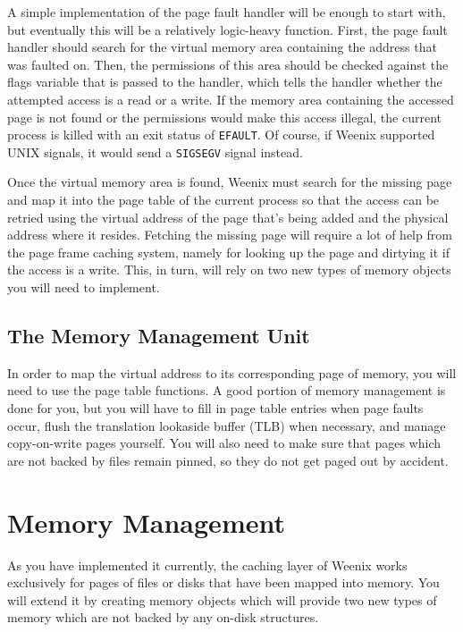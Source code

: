 A simple implementation of the page fault handler will be enough to start with, but eventually this will be a relatively logic-heavy function. First, the page fault handler should search for the virtual memory area containing the address that was faulted on. Then, the permissions of this area should be checked against the flags variable that is passed to the handler, which tells the handler whether the attempted access is a read or a write. If the memory area containing the accessed page is not found or the permissions would make this access illegal, the current process is killed with an exit status of \texttt{EFAULT}. Of course, if Weenix supported UNIX signals, it would send a \texttt{SIGSEGV} signal instead.

Once the virtual memory area is found, Weenix must search for the missing page and map it into the page table of the current process so that the access can be retried using the virtual address of the page that's being added and the physical address where it resides. Fetching the missing page will require a lot of help from the page frame caching system, namely for looking up the page and dirtying it if the access is a write. This, in turn, will rely on two new types of memory objects you will need to implement.

\subsection{The Memory Management Unit}

In order to map the virtual address to its corresponding page of memory, you will need to use the page table functions. A good portion of memory management is done for you, but you will have to fill in page table entries when page faults occur, flush the translation lookaside buffer (TLB) when necessary, and manage copy-on-write pages yourself. You will also need to make sure that pages which are not backed by files remain pinned, so they do not get paged out by accident.

\section{Memory Management}

As you have implemented it currently, the caching layer of Weenix works exclusively for pages of files or disks that have been mapped into memory. You will extend it by creating memory objects which will provide two new types of memory which are not backed by any on-disk structures.

